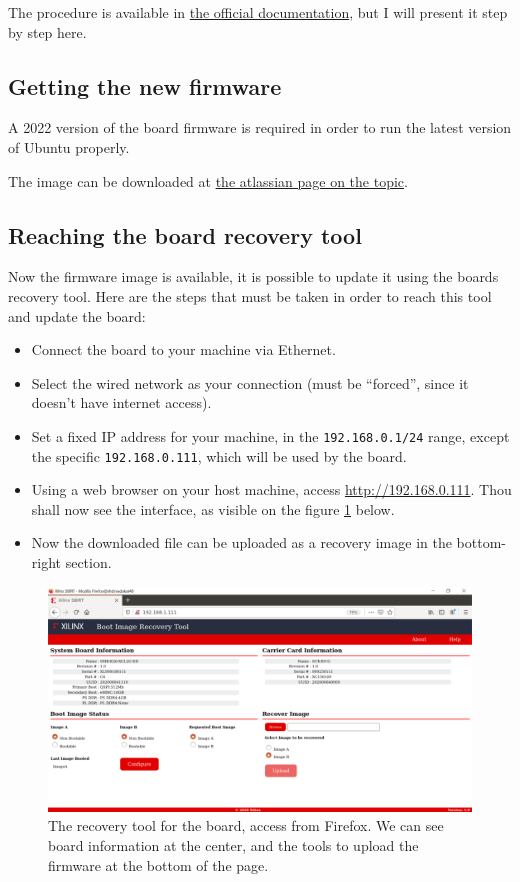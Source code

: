 \documentclass[10pt]{article}
\begin{document}
The procedure is available in
\href{https://docs.xilinx.com/r/en-US/ug1089-kv260-starter-kit/Firmware-Update}
{the official documentation}, but I will present it step by step here.

\subsection{Getting the new firmware}
A 2022 version of the board firmware is required in order to run the latest
version of Ubuntu properly.

The image can be downloaded at
\href{https://xilinx-wiki.atlassian.net/wiki/spaces/A/pages/1641152513/Kria+K26+
SOM#Boot-FW-update-with-xmutil}
{the atlassian page on the topic}.

\subsection{Reaching the board recovery tool}
Now the firmware image is available, it is possible to update it using the
boards recovery tool. Here are the steps that must be taken in order to reach
this tool and update the board:

\begin{itemize}
\item Connect the board to your machine via Ethernet.
\item Select the wired network as your connection (must be ``forced'', since it
  doesn't have internet access).
\item Set a fixed IP address for your machine, in the \verb|192.168.0.1/24|
  range, except the specific \verb|192.168.0.111|, which will be used by the
  board.
\item Using a web browser on your host machine, access
  \url{http://192.168.0.111}. Thou shall now see the interface, as visible on
  the figure \ref{fig:recovery} below.
\item Now the downloaded file can be uploaded as a recovery image in the
  bottom-right section.
\end{itemize}

\begin{figure}[H]
  \centering
  \includegraphics[width=1\textwidth]{./img/recovery.png}
  \caption{The recovery tool for the board, access from Firefox. We can see
    board information at the center, and the tools to upload the firmware at
    the bottom of the page.}
  \label{fig:recovery}
\end{figure}
\end{document}
